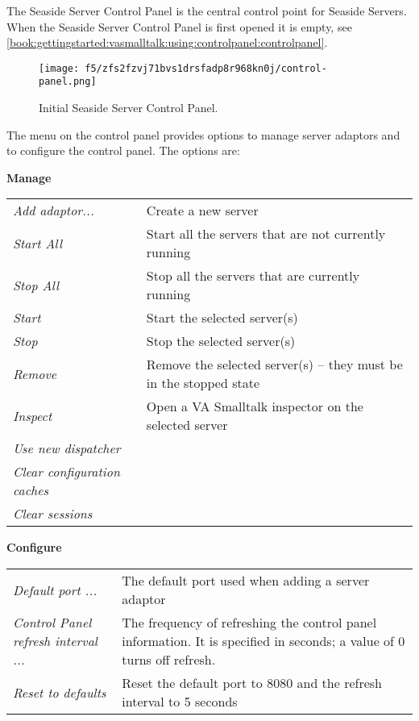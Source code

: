 \documentclass[a4paper,10pt,twoside]{book}
\begin{document}
The Seaside Server Control Panel is the central control point for Seaside Servers.  When the Seaside Server Control Panel is first opened it is empty, see \autoref{book:gettingstarted:vasmalltalk:using:controlpanel:controlpanel}.

\begin{figure}[h!tbp]
	\begin{center}
		\texttt{[image: f5/zfs2fzvj71bvs1drsfadp8r968kn0j/control-panel.png]}
		\caption{Initial Seaside Server Control Panel.\label{book:gettingstarted:vasmalltalk:using:controlpanel:controlpanel}}
	\end{center}
\end{figure}


The menu on the control panel provides options to manage server adaptors and to configure the control panel.  The options are:

\textbf{Manage}

\begin{tabularx}{\textwidth}{lX}
 \textit{Add adaptor...} &  Create a new server\\
 \textit{Start All} & Start all the servers that are not currently running\\
 \textit{Stop All} & Stop all the servers that are currently running\\
 \textit{Start} & Start the selected server(s)\\
 \textit{Stop} & Stop the selected server(s)\\
 \textit{Remove} & Remove the selected server(s) -- they must be in the stopped state\\
 \textit{Inspect} & Open a VA Smalltalk inspector on the selected server\\
 \textit{Use new dispatcher} &\\
 \textit{Clear configuration caches} &\\
 \textit{Clear sessions} &\\
\end{tabularx}
\textbf{Configure}

\begin{tabularx}{\textwidth}{lX}
 \textit{Default port ...} & The default port used when adding a server adaptor\\
 \textit{Control Panel refresh interval ...} & The frequency of refreshing the control panel information.  It is specified in seconds; a value of 0 turns off refresh.\\
 \textit{Reset to defaults} & Reset the default port to 8080 and the refresh interval to 5 seconds\\
\end{tabularx}
\end{document}
